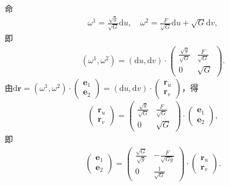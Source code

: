 \documentclass[../../main.tex]{subfiles}%
\begin{document}
\begin{solution}

命
\begin{align*}
\omega^1=\frac{\sqrt{g}}{\sqrt{G}}\mathrm{d}u,\quad \omega^2=\frac{F}{\sqrt{G}}\mathrm{d}u+\sqrt{G}\mathrm{d}v,
\end{align*}
即
\begin{align*}
(\omega^1,\omega^2)=(\mathrm{d}u,\mathrm{d}v)\cdot\begin{pmatrix}\frac{\sqrt{g}}{\sqrt{G}}&\frac{F}{\sqrt{G}}\\0&\sqrt{G}\end{pmatrix}.
\end{align*}
由$\mathrm{d}\boldsymbol{r}=(\omega^1,\omega^2)\cdot\begin{pmatrix}\boldsymbol{e}_1\\\boldsymbol{e}_2\end{pmatrix}=(\mathrm{d}u,\mathrm{d}v)\cdot\begin{pmatrix}\boldsymbol{r}_u\\\boldsymbol{r}_v\end{pmatrix}$，得
\begin{align*}
\begin{pmatrix}\boldsymbol{r}_u\\\boldsymbol{r}_v\end{pmatrix}=\begin{pmatrix}\frac{\sqrt{g}}{\sqrt{G}}&\frac{F}{\sqrt{G}}\\0&\sqrt{G}\end{pmatrix}\cdot\begin{pmatrix}\boldsymbol{e}_1\\\boldsymbol{e}_2\end{pmatrix},
\end{align*}
即
\begin{align*}
\begin{pmatrix}\boldsymbol{e}_1\\\boldsymbol{e}_2\end{pmatrix}=\begin{pmatrix}\frac{\sqrt{G}}{\sqrt{g}}&-\frac{F}{\sqrt{Gg}}\\0&\frac{1}{\sqrt{G}}\end{pmatrix}\cdot\begin{pmatrix}\boldsymbol{r}_u\\\boldsymbol{r}_v\end{pmatrix}.
\end{align*}

\end{solution}
\end{document}
